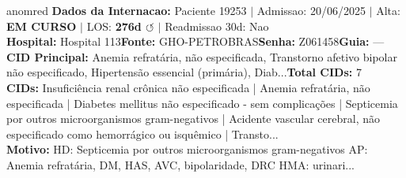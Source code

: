 \documentclass[a4paper,10pt]{article}
\begin{document}
\begin{anomalycard}[Internacao 136915 | GHO-PETROBRAS | CRITICO (z=5.03)]{anomred}
\textbf{Dados da Internacao:} Paciente 19253 $\mid$ Admissao: 20/06/2025 $\mid$ Alta: \textcolor{anomorange}{\textbf{EM CURSO}} $\mid$ LOS: \textbf{276d \textcolor{anomorange}{$\circlearrowleft$}} $\mid$ Readmissao 30d: Nao\\
\textbf{Hospital:} Hospital 113\quad\textbf{Fonte:} GHO-PETROBRAS\quad\textbf{Senha:} Z061458\quad\textbf{Guia:} ---\\
\textbf{CID Principal:} {\small Anemia refratária, não especificada, Transtorno afetivo bipolar não especificado, Hipertensão essencial (primária), Diab...}\quad\textbf{Total CIDs:} 7\\

\textbf{CIDs:} {\scriptsize Insuficiência renal crônica não especificada | Anemia refratária, não especificada | Diabetes mellitus não especificado - sem complicações | Septicemia por outros microorganismos gram-negativos | Acidente vascular cerebral, não especificado como hemorrágico ou isquêmico | Transto...}\\

\textbf{Motivo:} {\scriptsize HD: Septicemia por outros microorganismos gram-negativos  AP: Anemia refratária, DM, HAS, AVC, bipolaridade, DRC  HMA: urinari...}\\


\end{anomalycard}
\end{document}
